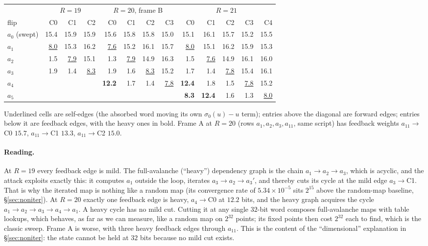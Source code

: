 \documentclass[11pt,a4paper]{article}
\newcommand{\sig}[1]{\sigma_{#1}}
\begin{document}
\begin{center}
\small
\begin{tabular}{@{}l rrr@{\hspace{1.6em}} rrrr@{\hspace{1.6em}} rrrrr@{}}
\toprule
 & \multicolumn{3}{c}{$R{=}19$} & \multicolumn{4}{c}{$R{=}20$, frame B} & \multicolumn{5}{c}{$R{=}21$} \\
flip & C0 & C1 & C2 & C0 & C1 & C2 & C3 & C0 & C1 & C2 & C3 & C4 \\
\midrule
$a_0$ (swept) & 15.4 & 15.9 & 15.9 & 15.6 & 15.8 & 15.8 & 15.0 & 15.1 & 16.1 & 15.7 & 15.2 & 15.5 \\
$a_1$ & \underline{8.0} & 15.3 & 16.2 & \underline{7.6} & 15.2 & 16.1 & 15.7 & \underline{8.0} & 15.1 & 16.2 & 15.9 & 15.3 \\
$a_2$ & 1.5 & \underline{7.9} & 15.1 & 1.3 & \underline{7.9} & 14.9 & 16.3 & 1.5 & \underline{7.6} & 14.9 & 16.1 & 16.0 \\
$a_3$ & 1.9 & 1.4 & \underline{8.3} & 1.9 & 1.6 & \underline{8.3} & 15.2 & 1.7 & 1.4 & \underline{7.8} & 15.4 & 16.1 \\
$a_4$ & & & & \textbf{12.2} & 1.7 & 1.4 & \underline{7.8} & \textbf{12.4} & 1.8 & 1.5 & \underline{7.8} & 15.2 \\
$a_5$ & & & & & & & & \textbf{8.3} & \textbf{12.4} & 1.6 & 1.3 & \underline{8.0} \\
\bottomrule
\end{tabular}
\end{center}

Underlined cells are self-edges (the absorbed word moving its own
$\sig{0}(u)-u$ term); entries above the diagonal are forward edges; entries
below it are feedback edges, with the heavy ones in bold.  Frame A at
$R{=}20$ (rows $a_1,a_2,a_3,a_{11}$, same script) has feedback weights
$a_{11}\to$C0 $15.7$, $a_{11}\to$C1 $13.3$, $a_{11}\to$C2 $15.0$.

\paragraph{Reading.}
At $R{=}19$ every feedback edge is mild.  The full-avalanche (``heavy'')
dependency graph is the chain $a_1\to a_2\to a_3$, which is acyclic, and the
attack exploits exactly this: it computes $a_1$ outside the loop, iterates
$a_3\to a_2\to a_3'$, and thereby cuts its cycle at the mild edge
$a_3\to$C1.  That is why the iterated map is nothing like a random map (its
convergence rate of $5.34\times10^{-5}$ sits $2^{15}$ above the random-map
baseline, \S\ref{sec:noniter}).  At $R{=}20$ exactly one feedback edge is
heavy, $a_4\to$C0 at $12.2$ bits, and the heavy graph acquires the cycle
$a_1\to a_2\to a_3\to a_4\to a_1$.  A heavy cycle has no mild cut.  Cutting
it at any single $32$-bit word composes full-avalanche maps with table
lookups, which behaves, as far as we can measure, like a random map on
$2^{32}$ points; its fixed points then cost $2^{32}$ each to find, which is
the classic sweep.  Frame A is worse, with three heavy feedback edges
through $a_{11}$.  This is the content of the ``dimensional'' explanation
in \S\ref{sec:noniter}: the state cannot be held at $32$ bits because no
mild cut exists.
\end{document}

